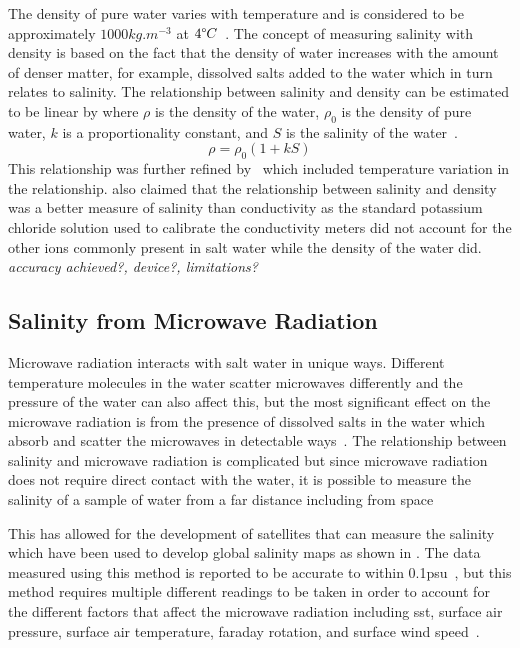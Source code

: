 The density of pure water varies with temperature and is considered to be approximately $1000 kg.m^{-3}$ at $4\degree C$~\cite{USGS_water_density_2018}.
The concept of measuring salinity with density is based on the fact that the density of water increases with the amount of denser matter, for example, dissolved salts added to the water which in turn relates to salinity.
The relationship between salinity and density can be estimated to be linear by  where $\rho$ is the density of the water, $\rho_0$ is the density of pure water, $k$ is a proportionality constant, and $S$ is the salinity of the water~\cite{kjerfve_salinity_measurement_overview_1983}\cite{uow_oceanography_research_1966}.
\begin{equation}\label{eq:salinity-density}
    \rho = \rho_0(1 + kS)
\end{equation}
This relationship was further refined by~ which included temperature variation in the relationship.
 also claimed that the relationship between salinity and density was a better measure of salinity than conductivity as the standard potassium chloride solution used to calibrate the conductivity meters did not account for the other ions commonly present in salt water while the density of the water did.
\textit{accuracy achieved?, device?, limitations?} 

\subsection{Salinity from Microwave Radiation}

Microwave radiation interacts with salt water in unique ways.
Different temperature molecules in the water scatter microwaves differently and the pressure of the water can also affect this, but the most significant effect on the microwave radiation is from the presence of dissolved salts in the water which absorb and scatter the microwaves in detectable ways~\cite{swift_considerations_for_microwave_salinity_1983}.
The relationship between salinity and microwave radiation is complicated but since microwave radiation does not require direct contact with the water, it is possible to measure the salinity of a sample of water from a far distance including from space~\cite{gabarro_microwave_salinity_2004}

This has allowed for the development of satellites that can measure the salinity which have been used to develop global salinity maps as shown in .
The data measured using this method is reported to be accurate to within 0.1\gls{psu}~\cite{yueh_microwave_salinity_error_sources_2001}, but this method requires multiple different readings to be taken in order to account for the different factors that affect the microwave radiation including \gls{sst}, surface air pressure, surface air temperature, faraday rotation, and surface wind speed~\cite{yueh_microwave_salinity_error_sources_2001}.

